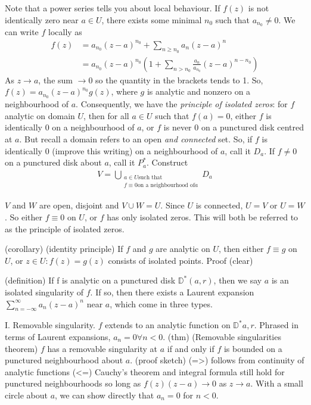 \documentclass{article}
\begin{document}
Note that a power series tells you about local behaviour.
If $f(z)$ is not identically zero near $a \in U$, there exists some minimal $n_0$ such that $a_{n_0} \neq 0$.
We can write $f$ locally as
\begin{align*}
    f(z) &= a_{n_0} (z-a)^{n_0} + \sum_{n \ge n_0} a_n (z-a)^n \\
         &= a_{n_0} (z-a)^{n_0} \left(1 + \sum_{n>n_0} \frac{a_n}{a_{n_0}} (z-a)^{n-n_0}\right)
\end{align*}
As $z \to a$, the sum $\to 0$ so the quantity in the brackets tends to 1.  So, $f(z) = a_{n_0} (z-a)^{n_0} g(z)$, where $g$ is analytic and nonzero on a neighbourhood of $a$.
Consequently, we have the \emph{principle of isolated zeros}: for $f$ analytic on domain $U$, then for all $a \in U$ such that $f(a) = 0$, either $f$ is identically $0$ on a neighbourhood of $a$, or $f$ is never $0$ on a punctured disk centred at $a$.  But recall a domain refers to an open \emph{and connected} set.  So, if $f$ is identically $0$ (improve this writing) on a neighbourhood of $a$, call it $D_a$.  If $f \ne 0$ on a punctured disk about $a$, call it $P_a^*$. Construct
\begin{align}
    V = \bigcup_{\substack{a \in U \text{such that} \\ f \equiv 0 \text{on a neighbourhood of} a}} D_a
\end{align}

$V$ and $W$ are open, disjoint and $V \cup W = U$. Since $U$ is connected, $U=V$ or $U=W$. So either $f \equiv 0$ on $U$, or $f$ has only isolated zeros.
This will both be referred to as the principle of isolated zeros.

(corollary) (identity principle)
If $f$ and $g$ are analytic on $U$, then either $f \equiv g$ on $U$, or ${z \in U : f(z) = g(z)}$ consists of isolated points.
Proof (clear)

(definition)
If f is analytic on a punctured disk $\mathbb{D}^*(a,r)$, then we say $a$ is an isolated singularity of $f$.
If so, then there exists a Laurent expansion $\sum_{n=-\infty}^{\infty} a_n (z-a)^n$ near $a$, which come in three types.

I. Removable singularity. $f$ extends to an analytic function on $\mathbb{D}^*{a, r}$. Phrased in terms of Laurent expansions, $a_n = 0 \forall n < 0$.
(thm) (Removable singularities theorem) $f$ has a removable singularity at $a$ if and only if $f$ is bounded on a punctured neighbourhood about $a$.
(proof sketch) (=>) follows from continuity of analytic functions
(<=) Cauchy's theorem and integral formula still hold for punctured neighbourhoods so long as $f(z) (z-a) \to 0$ as $z \to a$.  With a small circle about $a$, we can show directly that $a_n = 0$ for $n < 0$.
\end{document}
